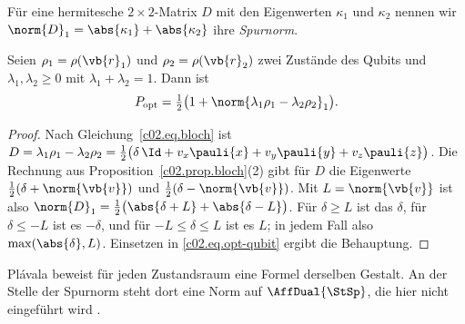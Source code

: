 \begin{vertiefung}[id=c02.v4,
    titel={Das Qubit-Optimum als Spurnorm},
    wozu={Gleichung~\eqref{c02.eq.opt-qubit} lässt sich ohne Koordinaten schreiben, direkt
      mit den Dichtematrizen der beiden Zustände.},
    voraussetzung={Abschnitt~\ref{c02.s4.3} und Proposition~\ref{c02.prop.optimum}.
      Der Kern braucht diesen Block nicht.},
    zurueck={Die Länge $\max(\abs{\delta}, \norm{\vb{v}})$ in
      Gleichung~\eqref{c02.eq.opt-qubit} ist eine Eigenschaft der Matrix
      $\lambda_1\rho_1 - \lambda_2\rho_2$ allein.}]
  Für eine hermitesche $2\times 2$-Matrix $D$ mit den Eigenwerten $\kappa_1$ und $\kappa_2$
  nennen wir $\norm{D}_1 = \abs{\kappa_1} + \abs{\kappa_2}$ ihre \emph{Spurnorm}.

  \begin{proposition}[Spurnormformel]\label{c02.prop.spurnorm}
    Seien $\rho_1 = \rho(\vb{r}_1)$ und $\rho_2 = \rho(\vb{r}_2)$ zwei Zustände des Qubits
    und $\lambda_1, \lambda_2 \geq 0$ mit $\lambda_1 + \lambda_2 = 1$. Dann ist
    \begin{equation}\label{c02.eq.spurnorm}
      P_{\mathrm{opt}} = \tfrac12\bigl(1 + \norm{\lambda_1 \rho_1 - \lambda_2 \rho_2}_1\bigr) .
    \end{equation}
  \end{proposition}
  \begin{proof}
    Nach Gleichung~\eqref{c02.eq.bloch} ist
    $D = \lambda_1\rho_1 - \lambda_2\rho_2
       = \tfrac12\bigl(\delta\, \Id + v_x \pauli{x} + v_y \pauli{y} + v_z \pauli{z}\bigr)$.
    Die Rechnung aus Proposition~\ref{c02.prop.bloch}(2) gibt für $D$ die Eigenwerte
    $\tfrac12(\delta + \norm{\vb{v}})$ und $\tfrac12(\delta - \norm{\vb{v}})$. Mit
    $L = \norm{\vb{v}}$ ist also
    $\norm{D}_1 = \tfrac12\bigl(\abs{\delta + L} + \abs{\delta - L}\bigr)$. Für
    $\delta \geq L$ ist das $\delta$, für $\delta \leq -L$ ist es $-\delta$, und für
    $-L \leq \delta \leq L$ ist es $L$; in jedem Fall also $\max(\abs{\delta}, L)$.
    Einsetzen in \eqref{c02.eq.opt-qubit} ergibt die Behauptung.
  \end{proof}

  Plávala beweist für jeden Zustandsraum eine Formel derselben Gestalt. An der Stelle der
  Spurnorm steht dort eine Norm auf $\AffDual{\StSp}$, die hier nicht eingeführt wird
  .
\end{vertiefung}

